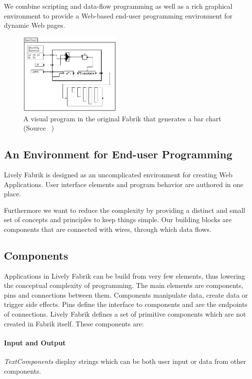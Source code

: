 \documentclass[pdftex, times, 10pt, twocolumn]{article}
\begin{document}
We combine scripting and data-flow programming as well as a rich graphical environment to provide a Web-based end-user programming environment for dynamic Web pages.  



\begin{figure}[]\centering
\includegraphics[width=0.450000\textwidth]{Fabrik_figure6.png} 

\caption{A visual program in the original Fabrik that generates a bar chart (Source ~\cite{Ingalls1988FVP}) }
\label{fig:FabrikBarChart}
\end{figure}


\subsection{An Environment for End-user Programming}
Lively Fabrik is designed as an uncomplicated environment for creating Web Applications. User interface elements and program behavior are authored in one place.  

Furthermore we want to reduce the complexity by providing a distinct and small set of concepts and principles to keep things simple. Our building blocks are components that are connected with wires, through which data flows.  



\subsection{Components}
Applications in Lively Fabrik can be build from very few elements, thus lowering the conceptual complexity of programming. The main elements are components, pins and connections between them. Components manipulate data, create data or trigger side effects. Pins define the interface to components and are the endpoints of connections. Lively Fabrik defines a set of primitive components which are not created in Fabrik itself. These components are: 



\paragraph{Input and Output}
{\em TextComponents} display strings which can be both user input or data from other components. 
\end{document}
